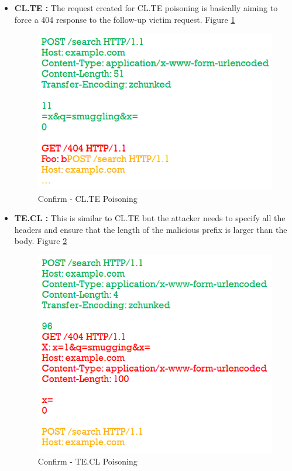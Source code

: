 \begin{itemize}
	\item \textbf{CL.TE : } The request created for CL.TE poisoning is basically aiming to force a 404 response to the follow-up victim request. Figure \ref{fig:Confirm-CL.TE Poisoning}  
	\begin{figure}
		\includegraphics{images/Confirm_CL.TE}
		\caption{Confirm - CL.TE Poisoning}
		\label{fig:Confirm-CL.TE Poisoning}
	\end{figure}
	\item \textbf{TE.CL : } This is similar to CL.TE but the attacker needs to specify all the headers and ensure that the length of the malicious prefix is larger than the body. Figure \ref{fig:Confirm-TE.CL Poisoning}
	\begin{figure}
		\includegraphics{images/Confirm_TE.CL}
		\caption{Confirm - TE.CL Poisoning}
		\label{fig:Confirm-TE.CL Poisoning}
	\end{figure}
\end{itemize}


